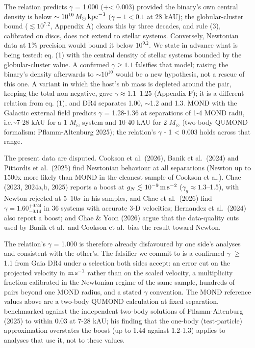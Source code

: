 \documentclass[
  10pt,
]{article}
\begin{document}
The relation predicts $\gamma$ = 1.000 (+\textless{} 0.003) provided the binary's own central density is below $\sim10^{10}\,M_\odot\,{\rm kpc}^{-3}$ ($\gamma-1<0.1$ at 28 kAU); the globular-cluster bound ($\lesssim10^{7.2}$, Appendix A) clears this by three decades, and rule (3), calibrated on discs, does not extend to stellar systems. Conversely, Newtonian data at 1\% precision would bound it below $10^{9.2}$. We state in advance what is being tested: eq. (1) with the central density of stellar systems bounded by the globular-cluster value. A confirmed $\gamma\ge1.1$ falsifies that model; raising the binary's density afterwards to $\sim10^{10}$ would be a new hypothesis, not a rescue of this one. A variant in which the host's nb mass is depleted around the pair, keeping the total non-negative, gave $\gamma\approx1.1$--1.25 (Appendix F); it is a different relation from eq. (1), and DR4 separates 1.00, $\sim$1.2 and 1.3. MOND with the Galactic external field predicts $\gamma$ = 1.28-1.36 at separations of 1-4 MOND radii, i.e.\textasciitilde{}7-28 kAU for a 1 $M_\odot$ system and 10-40 kAU for 2 $M_\odot$ (two-body QUMOND formalism: Pflamm-Altenburg 2025); the relation's $\gamma$ - 1 \textless{} 0.003 holds across that range.

The present data are disputed. Cookson et al. (2026), Banik et al.~(2024) and Pittordis et al.~(2025) find Newtonian behaviour at all separations (Newton up to 1500x more likely than MOND in the cleanest sample of Cookson et al.). Chae (2023, 2024a,b, 2025) reports a boost at $g_N\lesssim10^{-9}\,{\rm m\,s^{-2}}$ ($\gamma_g\approx1.3$--1.5), with Newton rejected at 5--10$\sigma$ in his samples, and Chae et al.~(2026) find $\gamma=1.60^{+0.24}_{-0.14}$ in 36 systems with accurate 3-D velocities; Hernandez et al.~(2024) also report a boost; and Chae \& Yoon (2026) argue that the data-quality cuts used by Banik et al.~and Cookson et al.~bias the result toward Newton.

The relation's $\gamma$ = 1.000 is therefore already disfavoured by one side's analyses and consistent with the other's. The falsifier we commit to is a confirmed $\gamma$ $\ge$ 1.1 from Gaia DR4 under a selection both sides accept: an error cut on the projected velocity in ${\rm m\,s^{-1}}$ rather than on the scaled velocity, a multiplicity fraction calibrated in the Newtonian regime of the same sample, hundreds of pairs beyond one MOND radius, and a stated $\gamma$ convention. The MOND reference values above are a two-body QUMOND calculation at fixed separation, benchmarked against the independent two-body solutions of Pflamm-Altenburg (2025) to within 0.03 at 7-28 kAU; his finding that the one-body (test-particle) approximation overstates the boost (up to 1.44 against 1.2-1.3) applies to analyses that use it, not to these values.
\end{document}
